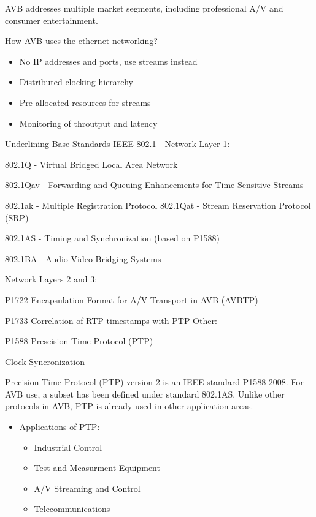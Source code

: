 { AVB addresses multiple market segments, including professional A/V and consumer entertainment. }

How AVB uses the ethernet networking?

\begin{itemize}
	\item No IP addresses and ports, use streams instead
	\item Distributed clocking hierarchy
	\item Pre-allocated resources for streams
	\item Monitoring of throutput and latency
\end{itemize}

{ Underlining Base Standards }
IEEE 802.1 - Network Layer-1:

	{ 802.1Q - Virtual Bridged Local Area Network }

	{ 802.1Qav - Forwarding and Queuing Enhancements for Time-Sensitive Streams }

	{ 802.1ak - Multiple Registration Protocol }
	{ 802.1Qat - Stream Reservation Protocol (SRP)}

	{ 802.1AS - Timing and Synchronization (based on P1588)}

	{ 802.1BA - Audio Video Bridging Systems }

Network Layers 2 and 3:
	\item P1722 Encapsulation Format for A/V Transport in AVB (AVBTP)
	\item P1733 Correlation of RTP timestamps with PTP
Other:
	\item P1588 Prescision Time Protocol (PTP)



{ Clock Syncronization }


{ Precision Time Protocol (PTP) version 2 is an IEEE standard P1588-2008.
For AVB use, a subset has been defined under standard 802.1AS.
Unlike other protocols in AVB, PTP is already used in other application areas.}
\begin{itemize}
	\item Applications of PTP:
	\begin{itemize}
		\item Industrial Control
		\item Test and Measurment Equipment
		\item A/V Streaming and Control
		\item Telecommunications
	\end{itemize}
\end{itemize}

